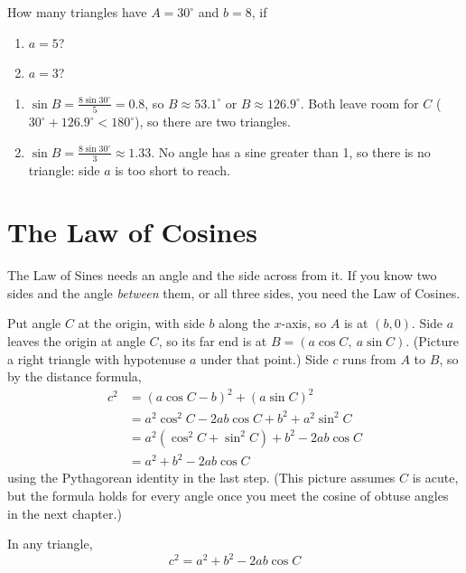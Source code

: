 \begin{Exercise}[title={How Many Triangles?}, label=ls_ssa]
How many triangles have $A = 30^\circ$ and $b = 8$, if
\begin{enumerate}
\item $a = 5$?
\item $a = 3$?
\end{enumerate}
\end{Exercise}
\begin{Answer}[ref=ls_ssa]
\begin{enumerate}
\item $\sin B = \frac{8\sin 30^\circ}{5} = 0.8$, so $B \approx 53.1^\circ$ or
$B \approx 126.9^\circ$. Both leave room for $C$ ($30^\circ + 126.9^\circ < 180^\circ$),
so there are two triangles.
\item $\sin B = \frac{8\sin 30^\circ}{3} \approx 1.33$. No angle has a sine greater
than 1, so there is no triangle: side $a$ is too short to reach.
\end{enumerate}
\end{Answer}

\section{The Law of Cosines}

The Law of Sines needs an angle and the side across from it. If you know two sides
and the angle \emph{between} them, or all three sides, you need the Law of Cosines.

Put angle $C$ at the origin, with side $b$ along the $x$-axis, so $A$ is at
$(b, 0)$. Side $a$ leaves the origin at angle $C$, so its far end is at
$B = (a\cos C,\ a\sin C)$. (Picture a right triangle with hypotenuse $a$ under that
point.) Side $c$ runs from $A$ to $B$, so by the distance formula,
\begin{align*}
c^2 &= (a\cos C - b)^2 + (a\sin C)^2 \\
    &= a^2\cos^2 C - 2ab\cos C + b^2 + a^2\sin^2 C \\
    &= a^2(\cos^2 C + \sin^2 C) + b^2 - 2ab\cos C \\
    &= a^2 + b^2 - 2ab\cos C
\end{align*}
using the Pythagorean identity in the last step. (This picture assumes $C$ is
acute, but the formula holds for every angle once you meet the cosine of obtuse
angles in the next chapter.)

\begin{mdframed}[style = important, frametitle = {The Law of Cosines}]
In any triangle,
$$c^2 = a^2 + b^2 - 2ab\cos C$$
\end{mdframed}

